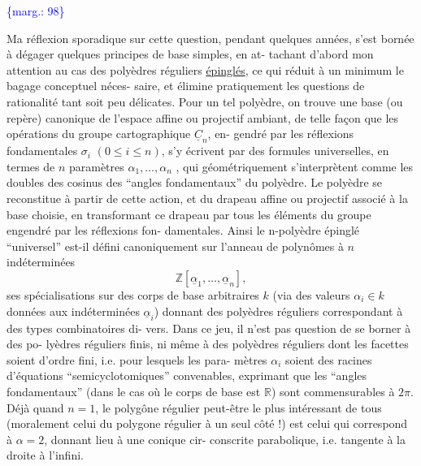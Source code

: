 \documentclass[11pt]{article}
\newcommand{\scanpage}[1]{\par\bigskip\noindent{\small\sffamily[scan #1]}\par}
\newcommand{\mspage}[1]{{\small\sffamily[p.\,#1]}}
\newcommand{\margin}[1]{\textcolor{blue}{\{\textsf{marg.:} #1\}}}
\newcommand{\uline}[1]{\underline{#1}}
\begin{document}
\margin{98}

\clearpage
\scanpage{119/99}
\mspage{21}

Ma réflexion sporadique sur cette question, pendant quelques années,
s'est bornée à dégager quelques principes de base simples, en at-%
tachant d'abord mon attention au cas des polyèdres réguliers
\uline{épinglés}, ce qui réduit à un minimum le bagage conceptuel néces-%
saire, et élimine pratiquement les questions de rationalité tant
soit peu délicates. Pour un tel polyèdre, on trouve une base (ou
repère) canonique de l'espace affine ou projectif ambiant, de
telle façon que les opérations du groupe cartographique $\underline{C}_n$, en-%
gendré par les réflexions fondamentales $\sigma_i$ $(0 \leq i \leq n)$, s'y
écrivent par des formules universelles, en termes de $n$ paramètres
$\alpha_1,\ldots,\alpha_n$ , qui géométriquement s'interprètent comme les doubles
des cosinus des ``angles fondamentaux'' du polyèdre. Le polyèdre se
reconstitue à partir de cette action, et du drapeau affine ou
projectif associé à la base choisie, en transformant ce drapeau
par tous les éléments du groupe engendré par les réflexions fon-%
damentales. Ainsi le n-polyèdre épinglé ``universel'' est-il défini
canoniquement sur l'anneau de polynômes à $n$ indéterminées
\[ \mathbb{Z}[\underline{\alpha}_1,\ldots,\underline{\alpha}_n] , \]
ses spécialisations sur des corps de base arbitraires $k$ (via
des valeurs $\alpha_i \in k$ données aux indéterminées $\underline{\alpha}_i$) donnant des
polyèdres réguliers correspondant à des types combinatoires di-%
vers. Dans ce jeu, il n'est pas question de se borner à des po-%
lyèdres réguliers finis, ni même à des polyèdres réguliers dont
les facettes soient d'ordre fini, i.e. pour lesquels les para-%
mètres $\alpha_i$ soient des racines d'équations ``semicyclotomiques''
convenables, exprimant que les ``angles fondamentaux'' (dans le
cas où le corps de base est $\mathbb{R}$) sont commensurables à $2\pi$. Déjà
quand $n = 1$, le polygône régulier peut-être le plus intéressant
de tous (moralement celui du polygone régulier à un seul côté !)
est celui qui correspond à $\alpha = 2$, donnant lieu à une conique cir-%
conscrite parabolique, i.e. tangente à la droite à l'infini.
\end{document}
